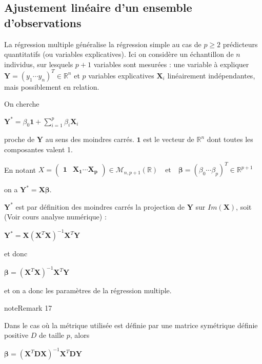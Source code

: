\documentclass[letterpaper,10pt,french]{sphinxmanual}
\begin{document}
\subsection{Ajustement linéaire d’un ensemble d’observations}
\label{\detokenize{regression:ajustement-lineaire-d-un-ensemble-d-observations}}\label{\detokenize{regression:index-2}}
\sphinxAtStartPar
La régression multiple généralise la régression simple au cas de \(p\geq 2\) prédicteurs quantitatifs (ou variables explicatives). Ici on considère un échantillon de \(n\) individus, sur lesquels \(p+1\) variables sont mesurées : une variable à expliquer \(\mathbf Y = (y_1\cdots y_n)^T\in\mathbb{R}^n\) et \(p\) variables explicatives \(\mathbf X_i\) linéairement indépendantes, mais possiblement en relation.

\sphinxAtStartPar
On cherche

\sphinxAtStartPar
\(\mathbf Y^* = \beta_0 \mathbf{1} + \displaystyle\sum_{i=1}^p \beta_i\mathbf X_i\)

\sphinxAtStartPar
proche de \(\mathbf Y\) au sens des moindres carrés. \(\mathbf{1}\) est le vecteur de \(\mathbb{R}^n\) dont toutes les composantes valent 1.

\sphinxAtStartPar
En notant
\(X = \begin{pmatrix}\mathbf{1} & \mathbf{X_1}\cdots \mathbf{X_p}\end{pmatrix}\in\mathcal{M}_{n,p+1}(\mathbb{R})\quad\text{et}\quad \boldsymbol{\beta}=(\beta_0\cdots \beta_p)^T
\in\mathbb{R}^{p+1}\)

\sphinxAtStartPar
on a \(\mathbf Y^*=\mathbf X\boldsymbol \beta\).

\sphinxAtStartPar
\(\mathbf Y^*\) est par définition des moindres carrés la projection de \(\mathbf Y\) sur \(Im(\mathbf X)\), soit (Voir cours analyse numérique) :

\sphinxAtStartPar
\(\mathbf Y^* = \mathbf X(\mathbf X^T\mathbf X)^{-1}\mathbf X^T \mathbf Y\)

\sphinxAtStartPar
et donc

\sphinxAtStartPar
\(\boldsymbol\beta = (\mathbf X^T\mathbf X)^{-1}\mathbf X^T \mathbf Y\)

\sphinxAtStartPar
et on a donc les paramètres de la régression multiple.
\label{regression:remark-4}
\begin{sphinxadmonition}{note}{Remark 17}



\sphinxAtStartPar
Dans le cas où la métrique utilisée est définie par une matrice symétrique définie positive \(D\) de taille \(p\), alors

\sphinxAtStartPar
\(\boldsymbol\beta = (\mathbf X^T\mathbf D \mathbf X)^{-1}\mathbf X^T \mathbf D \mathbf Y\)
\end{sphinxadmonition}
\end{document}
